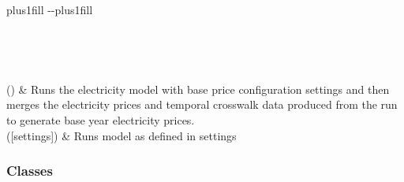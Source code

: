 \documentclass[letterpaper,10pt,english]{sphinxmanual}
\begin{document}
\begin{savenotes}
\sphinxatlongtablestart
\sphinxthistablewithglobalstyle
\sphinxthistablewithnovlinesstyle
\makeatletter
  \LTleft \@totalleftmargin plus1fill
  \LTright\dimexpr\columnwidth-\@totalleftmargin-\linewidth\relax plus1fill
\makeatother
\begin{longtable}{}
\sphinxtoprule
\endfirsthead

\\
\sphinxtoprule
\endhead

\sphinxbottomrule
{}\\
\endfoot

\endlastfoot
\sphinxtableatstartofbodyhook

\sphinxAtStartPar
{\hyperref[\detokenize{src.models.residential.preprocessor.generate_inputs:src.models.residential.preprocessor.generate_inputs.base_price}]{}}()
&
\sphinxAtStartPar
Runs the electricity model with base price configuration settings and then merges the electricity prices and temporal crosswalk data produced from the run to generate base year electricity prices.
\\
\sphinxhline
\sphinxAtStartPar
{}({[}settings{]})
&
\sphinxAtStartPar
Runs model as defined in settings
\\
\sphinxbottomrule
\end{longtable}
\sphinxtableafterendhook
\sphinxatlongtableend
\end{savenotes}
\subsubsection*{Classes}
\end{document}
